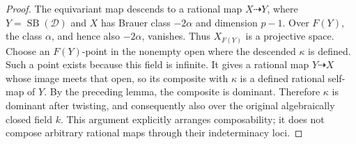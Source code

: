 \begin{proof}
The equivariant map descends to a rational map \(X\dashrightarrow
Y\), where \(Y=\operatorname{SB}(\mathcal D)\) and \(X\)
has Brauer class \(-2\alpha\) and dimension \(p-1\).
Over \(F(Y)\), the class \(\alpha\), and hence also \(-2\alpha\),
vanishes. Thus \(X_{F(Y)}\) is a projective space.
Choose an \(F(Y)\)-point in the nonempty open where the descended
\(\kappa\) is defined. Such a point exists because this field is
infinite. It gives a rational map \(Y\dashrightarrow X\) whose
image meets that open, so its composite with \(\kappa\) is a
defined rational self-map of \(Y\).
By the preceding lemma, the composite is dominant. Therefore
\(\kappa\) is dominant after twisting, and consequently also
over the original algebraically closed field \(k\).
This argument explicitly arranges composability; it does not
compose arbitrary rational maps through their indeterminacy loci.
\end{proof}

